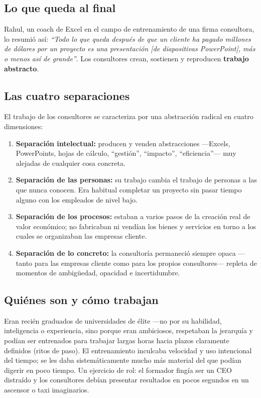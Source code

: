 \documentclass[a4paper,12pt]{article}
\begin{document}
\subsection*{Lo que queda al final}

Rahul, un coach de Excel en el campo de entrenamiento de una firma consultora, lo resumió así: \textit{``Todo lo que queda después de que un cliente ha pagado millones de dólares por un proyecto es una presentación [de diapositivas PowerPoint], más o menos así de grande''}. Los consultores crean, sostienen y reproducen \textbf{trabajo abstracto}.

\subsection*{Las cuatro separaciones}

El trabajo de los consultores se caracteriza por una abstracción radical en cuatro dimensiones:

\begin{enumerate}
  \item \textbf{Separación intelectual:} producen y venden abstracciones ---Excels, PowerPoints, hojas de cálculo, ``gestión'', ``impacto'', ``eficiencia''--- muy alejadas de cualquier cosa concreta.
  \item \textbf{Separación de las personas:} su trabajo cambia el trabajo de personas a las que nunca conocen. Era habitual completar un proyecto sin pasar tiempo alguno con los empleados de nivel bajo.
  \item \textbf{Separación de los procesos:} estaban a varios pasos de la creación real de valor económico; no fabricaban ni vendían los bienes y servicios en torno a los cuales se organizaban las empresas cliente.
  \item \textbf{Separación de lo concreto:} la consultoría permaneció siempre opaca ---tanto para las empresas cliente como para los propios consultores--- repleta de momentos de ambigüedad, opacidad e incertidumbre.
\end{enumerate}

\subsection*{Quiénes son y cómo trabajan}

Eran recién graduados de universidades de élite ---no por su habilidad, inteligencia o experiencia, sino porque eran ambiciosos, respetaban la jerarquía y podían ser entrenados para trabajar largas horas hacia plazos claramente definidos (ritos de paso). El entrenamiento inculcaba velocidad y uso intencional del tiempo; se les daba sistemáticamente mucho más material del que podían digerir en poco tiempo. Un ejercicio de rol: el formador fingía ser un CEO distraído y los consultores debían presentar resultados en pocos segundos en un ascensor o taxi imaginarios.
\end{document}
